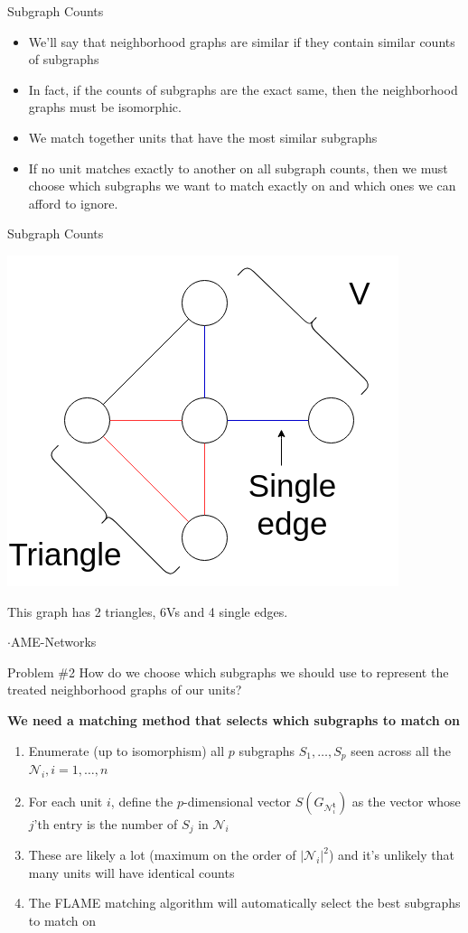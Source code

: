 \documentclass[newPxFont,numfooter,sectionpages]{beamer}
\begin{document}
\begin{frame}{Subgraph Counts}
	\begin{itemize}
		\item We'll say that neighborhood graphs are similar if they contain similar counts of subgraphs
    \item In fact, if the counts of subgraphs are the exact same, then the neighborhood graphs must be isomorphic.
    \item We match together units that have the most similar subgraphs
    \item If no unit matches exactly to another on all subgraph counts, then we must choose which subgraphs we want to match exactly on and which ones we can afford to ignore.
	\end{itemize}
\end{frame}
\begin{frame}{Subgraph Counts}
\begin{center}
  \includegraphics[width=0.7\linewidth]{subgraphs.png}
\end{center}
This graph has 2 triangles, 6Vs and 4 single edges.
\end{frame}
\begin{frame}{$\cdot$AME-Networks}
\begin{alertblock}{Problem \#2}
How do we choose which subgraphs we should use to represent the treated neighborhood graphs of our units?
\end{alertblock}
\textbf{We need a matching method that \textbf{selects} which subgraphs to match on}
\begin{enumerate}
  \item Enumerate (up to isomorphism) all $p$ subgraphs $S_1, \dots, S_p$ seen across all the $\mathcal{N}_i, i = 1, \dots, n$
  \item For each unit $i$, define the $p$-dimensional vector $S(G_{\mathcal{N}_i^{\mathbf{t}}})$ as the vector whose $j$'th entry is the number of $S_j$ in $\mathcal{N}_i$
  \item These are likely a lot (maximum on the order of $|\mathcal{N}_i|^2$) and it's unlikely that many units will have identical counts
  \item The FLAME matching algorithm will automatically select the best subgraphs to match on
\end{enumerate}
\end{frame}
\end{document}
